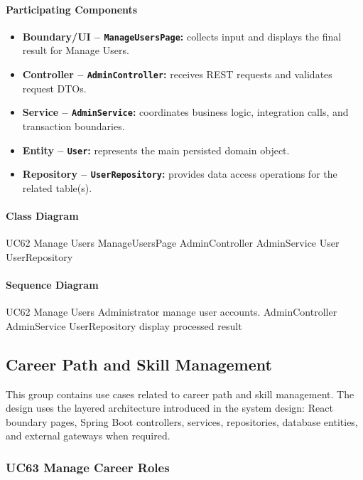 \paragraph{Participating Components}

\begin{itemize}
    \item \textbf{Boundary/UI -- \texttt{ManageUsersPage}:} collects input and displays the final result for Manage Users.
    \item \textbf{Controller -- \texttt{AdminController}:} receives REST requests and validates request DTOs.
    \item \textbf{Service -- \texttt{AdminService}:} coordinates business logic, integration calls, and transaction boundaries.
    \item \textbf{Entity -- \texttt{User}:} represents the main persisted domain object.
    \item \textbf{Repository -- \texttt{UserRepository}:} provides data access operations for the related table(s).
\end{itemize}

\paragraph{Class Diagram}

\ClassDiagram
{UC62 Manage Users}
{ManageUsersPage}
{AdminController}
{AdminService}
{User}
{UserRepository}

\paragraph{Sequence Diagram}

\SequenceDiagram
{UC62 Manage Users}
{Administrator}
{manage user accounts.}
{AdminController}
{AdminService}
{UserRepository}
{display processed result}

\subsection{Career Path and Skill Management}

This group contains use cases related to career path and skill management. The design uses the layered architecture introduced in the system design: React boundary pages, Spring Boot controllers, services, repositories, database entities, and external gateways when required.

\subsubsection{UC63 Manage Career Roles}

